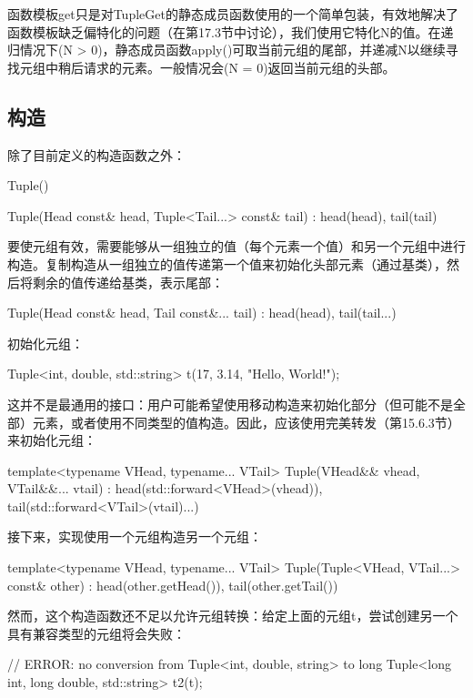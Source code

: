 函数模板get只是对TupleGet的静态成员函数使用的一个简单包装，有效地解决了函数模板缺乏偏特化的问题（在第17.3节中讨论），我们使用它特化N的值。在递归情况下(N > 0)，静态成员函数apply()可取当前元组的尾部，并递减N以继续寻找元组中稍后请求的元素。一般情况会(N = 0)返回当前元组的头部。

\subsection{构造}

除了目前定义的构造函数之外：

\begin{cpp}
Tuple() {
}

Tuple(Head const& head, Tuple<Tail...> const& tail)
: head(head), tail(tail) {
}
\end{cpp}

要使元组有效，需要能够从一组独立的值（每个元素一个值）和另一个元组中进行构造。复制构造从一组独立的值传递第一个值来初始化头部元素（通过基类），然后将剩余的值传递给基类，表示尾部：

\begin{cpp}
Tuple(Head const& head, Tail const&... tail)
: head(head), tail(tail...) {
}
\end{cpp}

初始化元组：

\begin{cpp}
Tuple<int, double, std::string> t(17, 3.14, "Hello, World!");
\end{cpp}

这并不是最通用的接口：用户可能希望使用移动构造来初始化部分（但可能不是全部）元素，或者使用不同类型的值构造。因此，应该使用完美转发（第15.6.3节）来初始化元组：

\begin{cpp}
template<typename VHead, typename... VTail>
Tuple(VHead&& vhead, VTail&&... vtail)
	: head(std::forward<VHead>(vhead)),
		tail(std::forward<VTail>(vtail)...) {
}
\end{cpp}

接下来，实现使用一个元组构造另一个元组：

\begin{cpp}
template<typename VHead, typename... VTail>
Tuple(Tuple<VHead, VTail...> const& other)
: head(other.getHead()), tail(other.getTail()) { }
\end{cpp}

然而，这个构造函数还不足以允许元组转换：给定上面的元组t，尝试创建另一个具有兼容类型的元组将会失败：

\begin{cpp}
// ERROR: no conversion from Tuple<int, double, string> to long
Tuple<long int, long double, std::string> t2(t);
\end{cpp}

